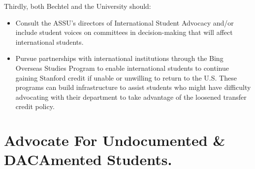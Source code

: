\documentclass[12pt, titlepage, letterpaper]{article}
\begin{document}
Thirdly, both Bechtel and the University should:
\begin{itemize}
    \item Consult the ASSU’s directors of International Student Advocacy and/or include student voices on committees in decision-making that will affect international students. 
    \item Pursue partnerships with international institutions through the Bing Overseas Studies Program to enable international students to continue gaining Stanford credit if unable or unwilling to return to the U.S. These programs can build infrastructure to assist students who might have difficulty advocating with their department to take advantage of the loosened transfer credit policy.

\end{itemize}

\newpage
\section*{Advocate For Undocumented \& DACAmented Students.}
%

\vspace{0.5em}\hline\hline
\end{document}
